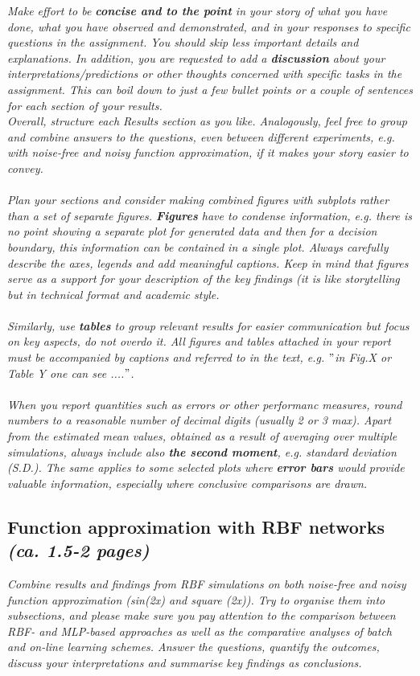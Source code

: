 \documentclass[a4paper]{article}
\begin{document}
\begin{framed}
\textit{Make effort to be \textbf{concise and to the point} in your story of what you have done, what you have observed and demonstrated, and in your responses to specific questions in the assignment. You should skip less important details and explanations. In addition, you are requested to add a \textbf{discussion} about your interpretations/predictions or other thoughts concerned with specific tasks in the assignment. This can boil down to just a few bullet points or a couple of sentences for each section of your results. \\ Overall, structure each Results section as you like. Analogously, feel free to group and combine answers to the questions, even between different experiments, e.g. with noise-free and noisy function approximation, if it makes your story easier to convey. \\
\\Plan your sections and consider making combined figures with subplots rather than a set of separate figures. \textbf{Figures} have to condense information, e.g. there is no point showing a separate plot for generated data and then for a decision boundary, this information can be contained in a single plot. Always carefully describe the axes, legends and add meaningful captions. Keep in mind that figures serve as a support for your description of the key findings (it is like storytelling but in technical format and academic style. \\
\\Similarly, use \textbf{tables} to group relevant results for easier communication but focus on key aspects, do not overdo it. All figures and tables attached in your report must be accompanied by captions and referred to in the text, e.g. $"$in Fig.X or Table Y one can see ....$"$. \\
\\When you report quantities such as errors or other performanc measures, round numbers to a reasonable number of decimal digits (usually 2 or 3 max). Apart from the estimated mean values, obtained as a result of averaging over multiple simulations, always include also \textbf{the second moment}, e.g. standard deviation (S.D.). The same applies to some selected plots where \textbf{error bars} would provide valuable information, especially where conclusive comparisons are drawn.} 
\end{framed}

\subsection{Function approximation with RBF networks\\ \normalsize{\textit{(ca. 1.5-2 pages)}}}
\textit{Combine results and findings from RBF simulations on both noise-free and noisy function approximation (sin(2x) and square (2x)). Try to organise them into subsections, and please make sure you pay attention to the comparison between RBF- and MLP-based approaches as well as the comparative analyses of batch and on-line learning schemes. Answer the questions, quantify the outcomes, discuss your interpretations and summarise key findings as conclusions.}
\end{document}
